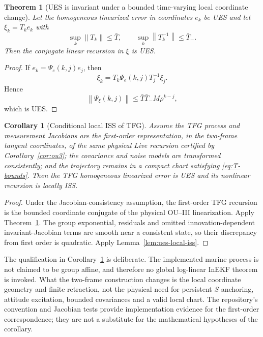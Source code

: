\documentclass[conference]{IEEEtran}
\newcommand{\norm}[1]{\left\lVert#1\right\rVert}
\newtheorem{theorem}{Theorem}
\newtheorem{corollary}{Corollary}
\theoremstyle{remark}
\begin{document}
\begin{theorem}[UES is invariant under a bounded time-varying local coordinate change]
\label{thm:coord-ues}
Let the homogeneous linearized error in coordinates $e_k$ be UES and let
$\xi_k=T_k e_k$ with
\begin{equation}
 \sup_k\norm{T_k}\le\bar T,
 \qquad
 \sup_k\norm{T_k^{-1}}\le\bar T_-.
 \label{eq:T-bounds}
\end{equation}
Then the conjugate linear recursion in $\xi$ is UES.
\end{theorem}

\begin{proof}
If $e_k=\Psi_e(k,j)e_j$, then
\begin{equation}
 \xi_k=T_k\Psi_e(k,j)T_j^{-1}\xi_j.
\end{equation}
Hence
\begin{equation}
 \norm{\Psi_\xi(k,j)}
 \le\bar T\bar T_-M\rho^{k-j},
\end{equation}
which is UES.
\end{proof}

\begin{corollary}[Conditional local ISS of TFG]
\label{cor:tfg}
Assume the TFG process and measurement Jacobians are the first-order
representation, in the two-frame tangent coordinates, of the same physical
Live recursion certified by Corollary~\ref{cor:ou3}; the covariance and noise
models are transformed consistently; and the trajectory remains in a compact
chart satisfying \eqref{eq:T-bounds}.  Then the TFG homogeneous linearized
error is UES and its nonlinear recursion is locally ISS.
\end{corollary}

\begin{proof}
Under the Jacobian-consistency assumption, the first-order TFG recursion is the
bounded coordinate conjugate of the physical OU--III linearization.  Apply
Theorem~\ref{thm:coord-ues}.  The group exponential, residuals and omitted
innovation-dependent invariant-Jacobian terms are smooth near a consistent
state, so their discrepancy from first order is quadratic.  Apply
Lemma~\ref{lem:ues-local-iss}.
\end{proof}

The qualification in Corollary~\ref{cor:tfg} is deliberate.  The implemented
marine process is not claimed to be group affine, and therefore no global
log-linear InEKF theorem is invoked.  What the two-frame construction changes
is the local coordinate geometry and finite retraction, not the physical need
for persistent $S$ anchoring, attitude excitation, bounded covariances and a
valid local chart.  The repository's convention and Jacobian tests provide
implementation evidence for the first-order correspondence; they are not a
substitute for the mathematical hypotheses of the corollary.
\end{document}
